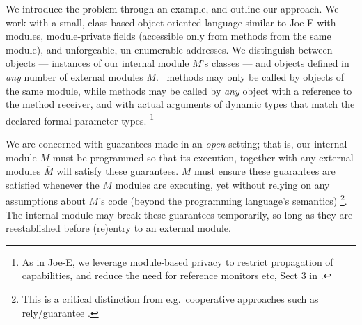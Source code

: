 \newcommand{\pwd}{key}

\renewcommand{\password}{key\xspace}

We introduce the problem  through an example, and outline our
approach.  We work with a  small, class-based object-oriented language similar to Joe-E \cite{JoeE} with modules,   module-private fields
({accessible} only from   methods {from} the same module),
and unforgeable, un-enumerable addresses.
We distinguish between  \emph{\internalO}
objects --- instances of our internal module $M$'s classes ---
and \emph{\externalO} objects defined in
\emph{any} number of external modules $\overline M$.~ 
{ methods  {may only be} called by objects of the same
  module,  while   methods  may be called by \emph{any}
  object with a reference to the method receiver, {and with
  actual arguments of  dynamic types that match} the declared formal parameter types.} 
\footnote{As in Joe-E, we leverage  module-based privacy to restrict propagation of capabilities, and reduce the need for reference monitors etc, \cf Sect 3 in  \cite{JoeE}.}   

 \label{s:concepts}

We are concerned with guarantees made in an \emph{open} setting; that
is, our internal module
$M$ must be programmed so that 
its execution, together with any external modules $\overline M$
will satisfy these guarantees.
$M$ must ensure these guarantees are satisfied
whenever the
$\overline M$  \emph{\externalM} modules are executing,
yet without relying on any assumptions about $\overline M$'s code
(beyond the programming language's semantics)%
\footnote{
This is a critical distinction from e.g.\
cooperative approaches such as rely/guarantee
\cite{relyGuarantee-HayesJones-setss2017,relyGuarantee-vanStaden-mpc2015}.}.
The internal module may break these guarantees temporarily,
so long as they {are reestablished} before (re)entry to an external module.
 

 
